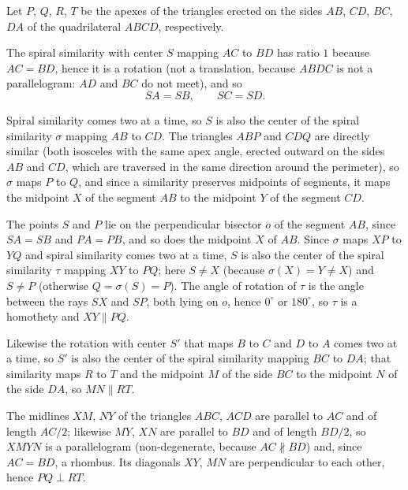 {
    Let $P$, $Q$, $R$, $T$ be the apexes of the triangles erected on the sides $AB$, $CD$, $BC$, $DA$ of the quadrilateral $ABCD$, respectively.

    The spiral similarity with center $S$ mapping $AC$ to $BD$ has ratio $1$ because $AC = BD$, hence it is a rotation (not a translation, because $ABDC$ is not a parallelogram: $AD$ and $BC$ do not meet), and so
    $$
    SA = SB, \qquad SC = SD.
    $$

    Spiral similarity comes two at a time, so $S$ is also the center of the spiral similarity $\sigma$ mapping $AB$ to $CD$. The triangles $ABP$ and $CDQ$ are directly similar (both isosceles with the same apex angle, erected outward on the sides $AB$ and $CD$, which are traversed in the same direction around the perimeter), so $\sigma$ maps $P$ to $Q$, and since a similarity preserves midpoints of segments, it maps the midpoint $X$ of the segment $AB$ to the midpoint $Y$ of the segment $CD$.


    The points $S$ and $P$ lie on the perpendicular bisector $o$ of the segment $AB$, since $SA = SB$ and $PA = PB$, and so does the midpoint $X$ of $AB$. Since $\sigma$ maps $XP$ to $YQ$ and spiral similarity comes two at a time, $S$ is also the center of the spiral similarity $\tau$ mapping $XY$ to $PQ$; here $S \neq X$ (because $\sigma(X) = Y \neq X$) and $S \neq P$ (otherwise $Q = \sigma(S) = P$). The angle of rotation of $\tau$ is the angle between the rays $SX$ and $SP$, both lying on $o$, hence $0^\circ$ or $180^\circ$, so $\tau$ is a homothety and $XY \parallel PQ$.

    Likewise the rotation with center $S'$ that maps $B$ to $C$ and $D$ to $A$ comes two at a time, so $S'$ is also the center of the spiral similarity mapping $BC$ to $DA$; that similarity maps $R$ to $T$ and the midpoint $M$ of the side $BC$ to the midpoint $N$ of the side $DA$, so $MN \parallel RT$.


    The midlines $XM$, $NY$ of the triangles $ABC$, $ACD$ are parallel to $AC$ and of length $AC/2$; likewise $MY$, $XN$ are parallel to $BD$ and of length $BD/2$, so $XMYN$ is a parallelogram (non-degenerate, because $AC \nparallel BD$) and, since $AC = BD$, a rhombus. Its diagonals $XY$, $MN$ are perpendicular to each other, hence $PQ \perp RT$.
}

